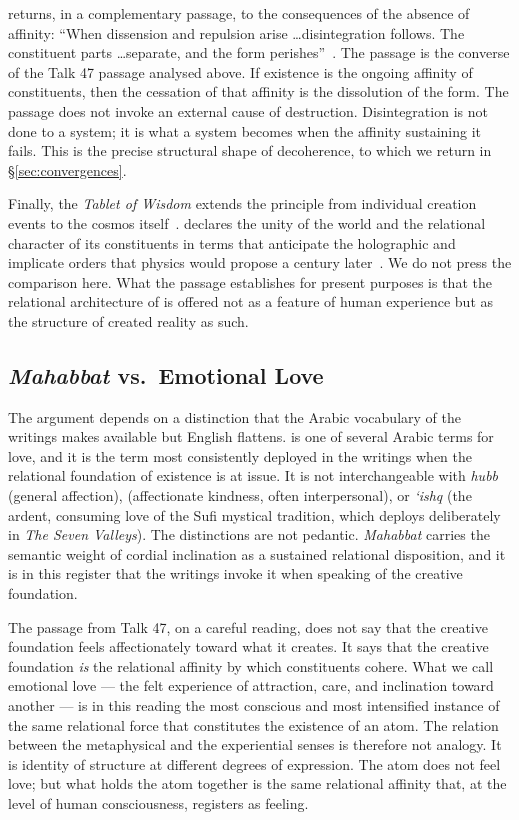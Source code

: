 \AbdulBaha returns, in a complementary passage, to the consequences of
the absence of affinity:
``When dissension and repulsion arise \ldots disintegration follows.
The constituent parts \ldots separate, and the form perishes''~\citep[Talk 41]{PUP}.
The passage is the converse of the Talk 47 passage analysed above.
If existence is the ongoing affinity of constituents, then the cessation of
that affinity is the dissolution of the form.
The passage does not invoke an external cause of destruction.
Disintegration is not done to a system; it is what a system becomes when the
affinity sustaining it fails.
This is the precise structural shape of decoherence, to which we return in
\S\ref{sec:convergences}.

Finally, the \textit{Tablet of Wisdom} extends the principle from individual
creation events to the cosmos itself~\citep{TabletsBahaullah}.
\Bahaullah declares the unity of the world and the relational character of
its constituents in terms that anticipate the holographic and implicate
orders that physics would propose a century later~\citep{Bohm1980,Susskind1995}.
We do not press the comparison here.
What the passage establishes for present purposes is that the relational
architecture of \mahabbat is offered not as a feature of human experience but
as the structure of created reality as such.

\subsection{\textit{Mahabbat} vs.\ Emotional Love}

The argument depends on a distinction that the Arabic vocabulary of the
\bahai writings makes available but English flattens.
\mahabbat is one of several Arabic terms for love, and it is the term most
consistently deployed in the writings when the relational foundation of
existence is at issue.
It is not interchangeable with \textit{hubb} (general affection),
\mawaddat (affectionate kindness, often interpersonal), or
\textit{\textquoteleft ishq} (the ardent, consuming love of the Sufi mystical
tradition, which \Bahaullah deploys deliberately in \textit{The Seven Valleys}).
The distinctions are not pedantic.
\textit{Mahabbat} carries the semantic weight of cordial inclination as a
sustained relational disposition, and it is in this register that the
writings invoke it when speaking of the creative foundation.

The passage from Talk 47, on a careful reading, does not say that the
creative foundation feels affectionately toward what it creates.
It says that the creative foundation \emph{is} the relational affinity by
which constituents cohere.
What we call emotional love --- the felt experience of attraction,
care, and inclination toward another --- is in this reading the most
conscious and most intensified instance of the same relational force that
constitutes the existence of an atom.
The relation between the metaphysical and the experiential senses is
therefore not analogy.
It is identity of structure at different degrees of expression.
The atom does not feel love; but what holds the atom together is the same
relational affinity that, at the level of human consciousness, registers
as feeling.

